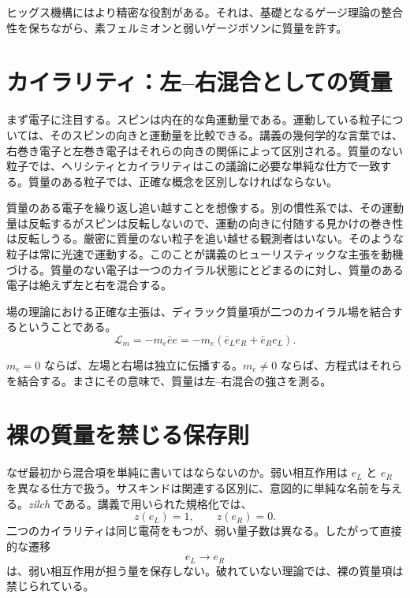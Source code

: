 ヒッグス機構にはより精密な役割がある。それは、基礎となるゲージ理論の整合性を保ちながら、素フェルミオンと弱いゲージボソンに質量を許す。

\section{カイラリティ：左--右混合としての質量}

まず電子に注目する。スピンは内在的な角運動量である。運動している粒子については、そのスピンの向きと運動量を比較できる。講義の幾何学的な言葉では、右巻き電子と左巻き電子はそれらの向きの関係によって区別される。質量のない粒子では、ヘリシティとカイラリティはこの議論に必要な単純な仕方で一致する。質量のある粒子では、正確な概念を区別しなければならない。

質量のある電子を繰り返し追い越すことを想像する。別の慣性系では、その運動量は反転するがスピンは反転しないので、運動の向きに付随する見かけの巻き性は反転しうる。厳密に質量のない粒子を追い越せる観測者はいない。そのような粒子は常に光速で運動する。このことが講義のヒューリスティックな主張を動機づける。質量のない電子は一つのカイラル状態にとどまるのに対し、質量のある電子は絶えず左と右を混合する。

場の理論における正確な主張は、ディラック質量項が二つのカイラル場を結合するということである。
\begin{equation}
\mathcal L_m
=
-m_e\bar e e
=
-m_e
\left(
  \bar e_L e_R
  +
  \bar e_R e_L
\right).
\end{equation}

$m_e=0$ ならば、左場と右場は独立に伝播する。$m_e\ne0$ ならば、方程式はそれらを結合する。まさにその意味で、質量は左--右混合の強さを測る。

\section{裸の質量を禁じる保存則}

なぜ最初から混合項を単純に書いてはならないのか。弱い相互作用は $e_L$ と $e_R$ を異なる仕方で扱う。サスキンドは関連する区別に、意図的に単純な名前を与える。\emph{zilch} である。講義で用いられた規格化では、
\begin{equation}
z(e_L)=1,
\qquad
z(e_R)=0.
\end{equation}
二つのカイラリティは同じ電荷をもつが、弱い量子数は異なる。したがって直接的な遷移
\begin{equation}
e_L\longrightarrow e_R
\end{equation}
は、弱い相互作用が担う量を保存しない。破れていない理論では、裸の質量項は禁じられている。

